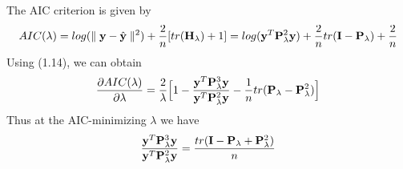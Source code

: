 \documentclass[11pt]{article}
\begin{document}
The AIC criterion is given by
\begin{align*}
AIC(\lambda)=log (\parallel {\bf y}-\hat{{\bf y}}\parallel ^2)+\frac{2}{n}[tr({\bf H}_\lambda)+1]=log({\bf y}^T {\bf P}_\lambda^2{\bf y})+\frac{2}{n}tr({\bf I}-{\bf P}_\lambda)+\frac{2}{n}
\end{align*}
Using (1.14), we can obtain
\begin{align}
\frac{\partial AIC(\lambda)}{\partial \lambda}=\frac{2}{\lambda}\Big[1-\frac{{\bf y}^T {\bf P}_\lambda^3{\bf y}}{{\bf y}^T {\bf P}_\lambda^2{\bf y}}-\frac{1}{n}tr({\bf P}_\lambda-{\bf P}_\lambda^2)\Big]
\end{align}
Thus at the AIC-minimizing $\lambda$ we have
\begin{align*}
\frac{{\bf y}^T {\bf P}_\lambda^3{\bf y}}{{\bf y}^T {\bf P}_\lambda^2{\bf y}}=\frac{tr({\bf I}-{\bf P}_\lambda+{\bf P}_\lambda^2)}{n}
\end{align*}

\clearpage



\end{document}
